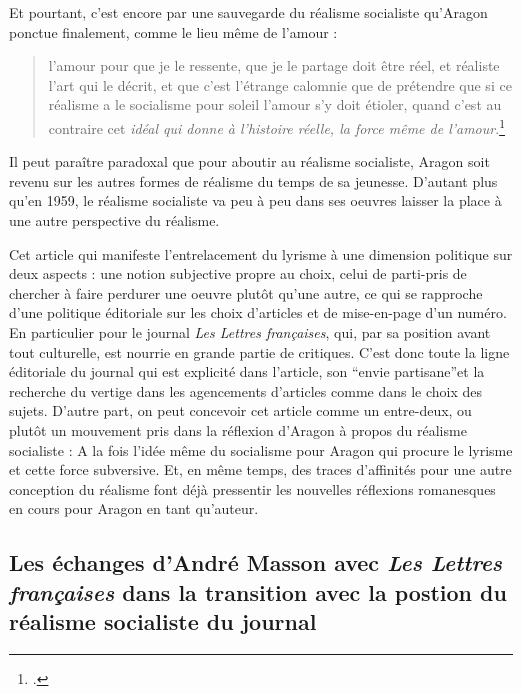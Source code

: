 	Et pourtant, c’est encore par une sauvegarde du réalisme socialiste qu’Aragon ponctue finalement, comme le lieu même de l’amour : 
\begin{quote}
  l’amour pour que je le ressente, que je le partage doit  être réel, et réaliste l’art qui le décrit, et que c’est l’étrange calomnie que de prétendre que si ce réalisme a le socialisme pour soleil l’amour s’y doit étioler, quand c’est au contraire cet \emph{idéal qui donne à l’histoire réelle, la force même de l’amour}.\footcite{savoiraimer}\end{quote}


Il peut paraître paradoxal que pour aboutir au réalisme socialiste, Aragon soit revenu sur les autres formes de réalisme du temps de sa jeunesse. D’autant plus qu’en 1959, le réalisme socialiste va peu à peu dans ses oeuvres laisser la place à une autre perspective du réalisme. 

	Cet article qui manifeste l’entrelacement du lyrisme à une dimension politique sur deux aspects : une notion subjective propre au choix, celui de parti-pris de chercher à faire perdurer une oeuvre plutôt qu’une autre, ce qui se rapproche d’une politique éditoriale sur les choix d’articles et de mise-en-page d’un numéro. En particulier pour le journal \emph{Les Lettres françaises}, qui, par sa position avant tout culturelle, est nourrie en grande partie de critiques. C’est donc toute la ligne éditoriale du journal qui est explicité dans l’article, son \enquote{envie partisane}et la recherche du vertige dans les agencements d’articles comme dans le choix des sujets. D’autre part, on peut concevoir cet article comme un entre-deux, ou plutôt un mouvement pris dans la réflexion d’Aragon à propos du réalisme socialiste :  A la fois l’idée même du socialisme  pour Aragon qui procure le lyrisme et cette force subversive. Et, en même temps, des traces d’affinités pour une autre conception du réalisme font déjà pressentir les nouvelles réflexions romanesques en cours pour Aragon en tant qu’auteur. 

\subsection{Les échanges d'André Masson avec \emph{Les Lettres françaises }dans la transition avec la postion du réalisme socialiste du journal}

